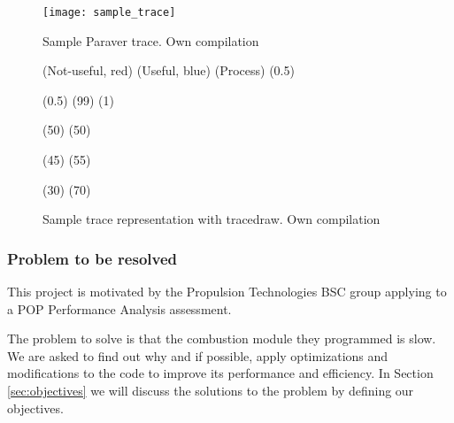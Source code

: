 \begin{itemize}
    \begin{figure}[htbp]
      \centering
      \texttt{[image: sample\_trace]}
      \caption[Sample Paraver trace]{Sample Paraver trace. Own compilation}
      \label{fig:trace}
    \end{figure}

    \begin{figure}[htbp]
      \centering
      \begin{tracedraw}{0.8}
        \tracedrawAddToLegend(\large{Not-useful}, red)
        \tracedrawAddToLegend(\large{Useful}, blue)
        \tracedrawEnableLineName(\large{Process})
        \tracedrawSetLegendColorScale(0.5)

        \tracedrawSetLineHeight(0.5)
        \tracedrawAddChunk[color=gray, fill=blue](99)
        \tracedrawAddChunk[color=gray, fill=red](1)

        \tracedrawNewLine

        \tracedrawAddChunk[color=gray, fill=blue](50)
        \tracedrawAddChunk[color=gray, fill=red](50)

        \tracedrawNewLine
        
        \tracedrawAddChunk[color=gray, fill=blue](45)
        \tracedrawAddChunk[color=gray, fill=red](55)

        \tracedrawNewLine
        
        \tracedrawAddChunk[color=gray, fill=blue](30)
        \tracedrawAddChunk[color=gray, fill=red](70)

      \end{tracedraw}
      \caption[Sample trace representation with tracedraw]{Sample trace representation with tracedraw. Own compilation}
      \label{fig:tracedraw}
    \end{figure}

\end{itemize}


\subsubsection{Problem to be resolved}
This project is motivated by the Propulsion Technologies BSC group applying to a POP Performance Analysis assessment.

The problem to solve is that the combustion module they programmed is slow. We are asked to find out why and if possible, apply optimizations and modifications to the code to improve its performance and efficiency. In Section \ref{sec:objectives} we will discuss the solutions to the problem by defining our objectives.


